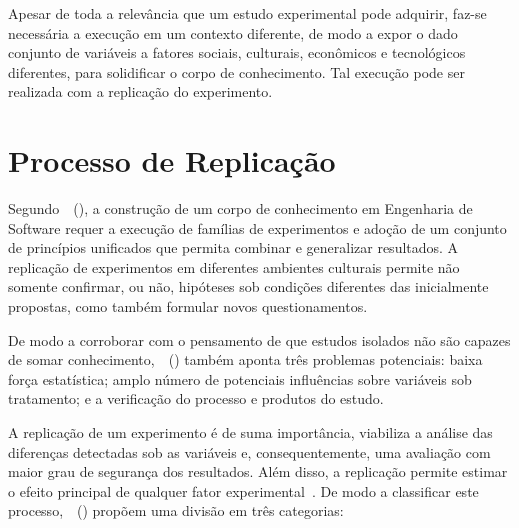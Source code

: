 Apesar de toda a relevância que um estudo experimental pode adquirir, faz-se necessária a execução em um contexto diferente, de modo a expor o dado conjunto de variáveis a fatores sociais, culturais, econômicos e tecnológicos diferentes, para solidificar o corpo de conhecimento. Tal execução pode ser realizada com a replicação do experimento.

\section{Processo de Replicação}

Segundo~~(\citeyear{Basili99}), a construção de um corpo de conhecimento em Engenharia de Software requer a execução de famílias de experimentos e adoção de um conjunto de princípios unificados que permita combinar e generalizar resultados. A replicação de experimentos em diferentes ambientes culturais permite não somente confirmar, ou não, hipóteses sob condições diferentes das inicialmente propostas, como também formular novos questionamentos. 

De modo a corroborar com o pensamento de que estudos isolados não são capazes de somar conhecimento,~~(\citeyear{Miller:2005}) também aponta três problemas potenciais: baixa força estatística; amplo número de potenciais influências sobre variáveis sob tratamento; e a verificação do processo e produtos do estudo.

A replicação de um experimento é de suma importância, viabiliza a análise das diferenças detectadas sob as variáveis e, consequentemente, uma avaliação com maior grau de segurança dos resultados. Além disso, a replicação permite estimar o efeito principal de qualquer fator experimental~\cite{kitchenham1997desmet}. De modo a classificar este processo,~~(\citeyear{Basili99}) propõem uma divisão em três categorias: 

